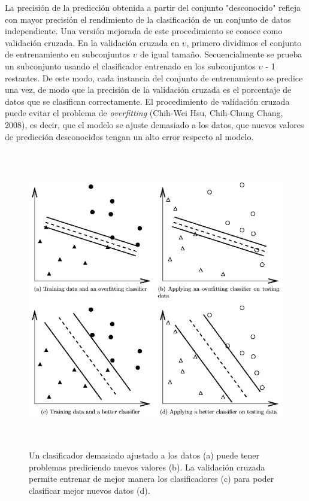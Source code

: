 La precisión de la predicción obtenida a partir del conjunto "desconocido" refleja con mayor precisión el rendimiento de la clasificación de un conjunto de datos independiente.  Una versión mejorada de este procedimiento se conoce como validación cruzada. En la validación cruzada en $\upsilon$, primero dividimos el conjunto de entrenamiento en subconjuntos $\upsilon$ de igual tamaño.  Secuencialmente se prueba un subconjunto usando el clasificador entrenado en los subconjuntos $\upsilon$ - 1 restantes.  De este modo, cada instancia del conjunto de entrenamiento se predice una vez, de modo que la precisión de la validación cruzada es el porcentaje de datos que se clasifican correctamente. El procedimiento de validación cruzada puede evitar el problema de \textit{overfitting} (Chih-Wei Hsu, Chih-Chung Chang, 2008), es decir, que el modelo se ajuste demasiado a los datos, que nuevos valores de predicción desconocidos tengan un alto error respecto al modelo. 

\begin{figure}
    \centering
    \includegraphics[height=5.15in]{figuras/Capture2.PNG}
    \caption{Un clasificador demasiado ajustado a los datos (a) puede tener problemas prediciendo nuevos valores (b). La validación cruzada permite entrenar de mejor manera los clasificadores (c) para poder clasificar mejor nuevos datos (d).}
    \label{fig:my_label}
\end{figure}

